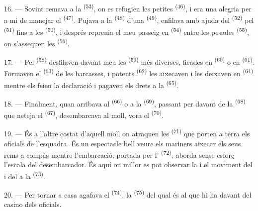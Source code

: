 16. --- Sovint remava a la  \textsuperscript{(53)}, on es
refugien les petites  \textsuperscript{(46)}, i era una
alegria per a mi de manejar el  \textsuperscript{(47)}. Pujava a la
 \textsuperscript{(48)} d'una 
\textsuperscript{(49)}, enfilava amb ajuda del 
\textsuperscript{(52)} pel  \textsuperscript{(51)} fins a les
 \textsuperscript{(50)}, i després reprenia el meu passeig en
 \textsuperscript{(54)} entre les pesades 
\textsuperscript{(55)}, on s'assequen les 
\textsuperscript{(56)}.

17. --- Pel  \textsuperscript{(58)} desfilaven davant meu les
 \textsuperscript{(59)} més diverses, ficades en
 \textsuperscript{(60)} o en 
\textsuperscript{(61)}. Formaven el  \textsuperscript{(63)} de
les barcasses, i potents  \textsuperscript{(62)} les aixecaven i les
deixaven en  \textsuperscript{(64)} mentre els
 feien la declaració i pagaven els drets a la
 \textsuperscript{(65)}.

18. --- Finalment, quan arribava al  \textsuperscript{(66)} o
a la  \textsuperscript{(69)}, passant per davant de la
 \textsuperscript{(68)} que neteja el 
\textsuperscript{(67)}, desembarcava al moll, vora el 
\textsuperscript{(70)}.

19. --- És a l'altre costat d'aquell moll on atraquen les 
\textsuperscript{(71)} que porten a terra els oficials de l'esquadra. És un
espectacle bell veure els mariners aixecar els seus rems a compàs mentre
l'embarcació, portada per l' \textsuperscript{(72)}, aborda sense
esforç l'escala del desembarcador. És aquí on millor es pot observar la
 i el moviment del  i del  a la
 \textsuperscript{(73)}.

\VUsaut{3.0mm}
\VUsaut{3.0mm}

20. --- Per tornar a casa agafava el 
\textsuperscript{(74)}, la  \textsuperscript{(75)} del qual és al
 que hi ha davant del casino dels oficials.

